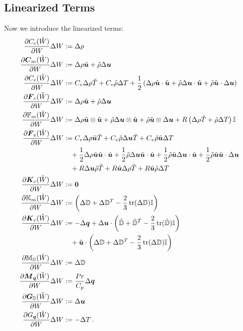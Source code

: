\documentclass[Dissertation.tex]{subfiles}
\begin{document}
\subsection{Linearized Terms}
Now we introduce the linearized terms:
\begin{align*}
\frac{\partial C_c(\tilde W)}{\partial W}\Delta W&:=
	\Delta\rho\\
\frac{\partial\boldsymbol C_m(\tilde W)}{\partial W}\Delta W&:=
	\Delta\rho\tilde{\boldsymbol u}+\tilde\rho\Delta\boldsymbol u\\
\frac{\partial C_e(\tilde W)}{\partial W}\Delta W&:=
	C_v\Delta\rho\tilde T+C_v\tilde\rho\Delta T
	+\frac{1}{2}\left( \Delta\rho\tilde{\boldsymbol u}\cdot\tilde{\boldsymbol u}+\tilde\rho\Delta\boldsymbol u\cdot\tilde{\boldsymbol u}+\tilde\rho\tilde{\boldsymbol u}\cdot\Delta\boldsymbol u \right)\\
\frac{\partial\boldsymbol F_c(\tilde W)}{\partial W}\Delta W&:=
	\Delta\rho\tilde{\boldsymbol u}+\tilde\rho\Delta\boldsymbol u\\
\frac{\partial\mathbb{F}_m(\tilde W)}{\partial W}\Delta W&:=
	\Delta\rho\tilde{\boldsymbol u}\otimes\tilde{\boldsymbol u}
	+\tilde\rho\Delta\boldsymbol u\otimes\tilde{\boldsymbol u}
	+\tilde\rho\tilde{\boldsymbol u}\otimes\Delta\boldsymbol u
	+R\left( \Delta\rho\tilde T+\tilde\rho\Delta T \right)\mathbb{I}\\
\frac{\partial\boldsymbol F_e(\tilde W)}{\partial W}\Delta W&:=
	C_v\Delta\rho\tilde{\boldsymbol u}\tilde T+C_v\tilde\rho\Delta\boldsymbol u\tilde T+C_v\tilde\rho\tilde{\boldsymbol u}\Delta T
	\\&\quad
	+\frac{1}{2}\Delta\rho\tilde{\boldsymbol u}\tilde{\boldsymbol u}\cdot\tilde{\boldsymbol u}
	+\frac{1}{2}\tilde\rho\Delta\boldsymbol u\tilde{\boldsymbol u}\cdot\tilde{\boldsymbol u}
	+\frac{1}{2}\tilde\rho\tilde{\boldsymbol u}\Delta\boldsymbol u\cdot\tilde{\boldsymbol u}
	+\frac{1}{2}\tilde\rho\tilde{\boldsymbol u}\tilde{\boldsymbol u}\cdot\Delta\boldsymbol u
	\\&\quad
	+R\Delta\boldsymbol u\tilde\rho\tilde T
	+R\tilde{\boldsymbol u}\Delta\rho\tilde T
	+R\tilde{\boldsymbol u}\tilde\rho\Delta T\\
\frac{\partial\boldsymbol K_c(\tilde W)}{\partial W}\Delta W&:=
	\boldsymbol 0\\
\frac{\partial\mathbb{K}_m(\tilde W)}{\partial W}\Delta W&:=
	\left( \Delta\mathbb{D}+\Delta\mathbb{D}^T-\frac{2}{3}\operatorname*{tr}(\Delta\mathbb{D})\mathbb{I} \right)\\
\frac{\partial\boldsymbol K_e(\tilde W)}{\partial W}\Delta W&:=
	-\Delta\boldsymbol q+\Delta\boldsymbol u\cdot\left( \tilde{\mathbb{D}}+\tilde{\mathbb{D}}^T-\frac{2}{3}\operatorname*{tr}(\tilde{\mathbb{D}})\mathbb{I} \right)
	\\&\quad
	+\tilde{\boldsymbol u}\cdot\left( \Delta\mathbb{D}+\Delta\mathbb{D}^T-\frac{2}{3}\operatorname*{tr}(\Delta\mathbb{D})\mathbb{I} \right)\\
\frac{\partial\mathbb{M}_{\mathbb{D}}(\tilde W)}{\partial W}\Delta W&:=
	\Delta\mathbb{D}\\
\frac{\partial\boldsymbol M_{\boldsymbol q}(\tilde W)}{\partial W}\Delta W&:=
	\frac{Pr}{C_p}\Delta\boldsymbol q\\
\frac{\partial\boldsymbol G_{\mathbb{D}}(\tilde W)}{\partial W}\Delta W&:=
	\Delta\boldsymbol u\\
\frac{\partial G_{\boldsymbol q}(\tilde W)}{\partial W}\Delta W&:=
	-\Delta T\,.
\end{align*}
\end{document}
